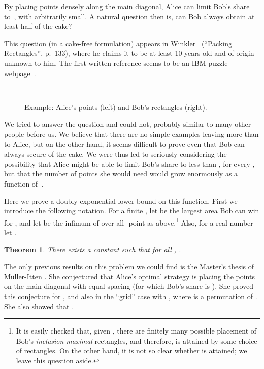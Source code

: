 \documentclass[11pt]{article}
\newtheorem{theorem}{Theorem}\newtheorem{definition}[theorem]{Definition}
\begin{document}
By placing points densely along the main diagonal,
Alice can limit Bob's share to~,
with  arbitrarily small.
A natural question then is, can Bob always obtain
 at least half of the cake?

This question (in a cake-free formulation) appears in
Winkler~\cite{Win07} (``Packing Rectangles'', p.~133),
where he claims it to be at least 10 years old and of
origin unknown to him. The first written reference seems
to be an IBM puzzle webpage~\cite{IBM04}.


\begin{figure}[tbh]
\centering
{}
~~~~~~~~~~~~~~~~~~
\caption{\label{f:example} Example: Alice's points (left)
and Bob's rectangles (right).}
\end{figure}



We tried to answer the question and could not, probably similar to many 
other people before us. We believe that there are no simple examples
leaving more than  to Alice, but on the other hand,
it seems difficult to prove even that Bob can always secure
 of the cake. We were thus led to seriously considering
the possibility that Alice might be able
to limit Bob's share to less than , for every ,
but that the number of points  she would need 
would grow enormously as a function of~.

Here we prove a doubly exponential lower bound on this function.
First we introduce the following notation. For a finite
,
let  be the largest area Bob can win for , and
let  be the infimum of  over all -point 
as above.\footnote{It is easily checked that, given ,
there are finitely many possible placement of 
Bob's \emph{inclusion-maximal} rectangles, and therefore,
 is attained by some choice of rectangles.
On the other hand, it is not so clear whether
 is attained; we leave this question
aside.} Also, for a real number  let
.

\begin{theorem}\label{t:} There exists a constant  such that for all ,
.
\end{theorem}

The only previous results on this problem we could find
is the Master's thesis of M\"{u}ller-Itten \cite{Mue10}. She conjectured
that  Alice's optimal strategy is placing the  points
on the main diagonal with equal spacing (for which Bob's share
is ). She proved
this conjecture for , and also in the ``grid''
case with , where  is a permutation of .
She also showed that .
\end{document}
